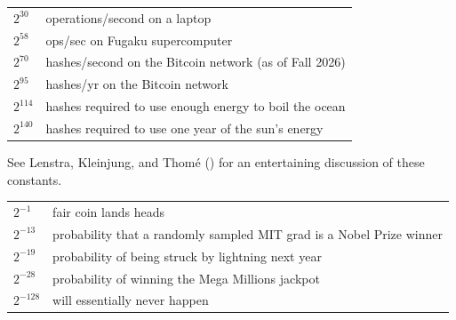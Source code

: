 \documentclass[
  letterpaper,
]{scrbook}
\newcounter{none} %
\theoremstyle{definition}
\theoremstyle{plain}
\theoremstyle{plain}
\theoremstyle{remark}
\begin{document}
{\def\LTcaptype{none} %
\begin{longtable}[]{@{}
  >{\raggedleft\arraybackslash}p{}
  >{\raggedright\arraybackslash}p{}@{}}
\toprule\noalign{}
\endhead
\bottomrule\noalign{}
\endlastfoot
\(2^{30}\) & operations/second on a laptop \\
\(2^{58}\) & ops/sec on Fugaku supercomputer \\
\(2^{70}\) & hashes/second on the Bitcoin network (as of Fall 2026) \\
\(2^{95}\) & hashes/yr on the Bitcoin network \\
\(2^{114}\) & hashes required to use enough energy to boil the ocean \\
\(2^{140}\) & hashes required to use one year of the sun's energy \\
\end{longtable}
}

See Lenstra, Kleinjung, and Thomé
() for an
entertaining discussion of these constants.

{\def\LTcaptype{none} %
\begin{longtable}[]{@{}
  >{\raggedleft\arraybackslash}p{}
  >{\raggedright\arraybackslash}p{}@{}}
\toprule\noalign{}
\endhead
\bottomrule\noalign{}
\endlastfoot
\(2^{-1}\) & fair coin lands heads \\
\(2^{-13}\) & probability that a randomly sampled MIT grad is a Nobel
Prize winner \\
\(2^{-19}\) & probability of being struck by lightning next year \\
\(2^{-28}\) & probability of winning the Mega Millions jackpot \\
\(2^{-128}\) & will essentially never happen \\
\end{longtable}
}

\end{document}
